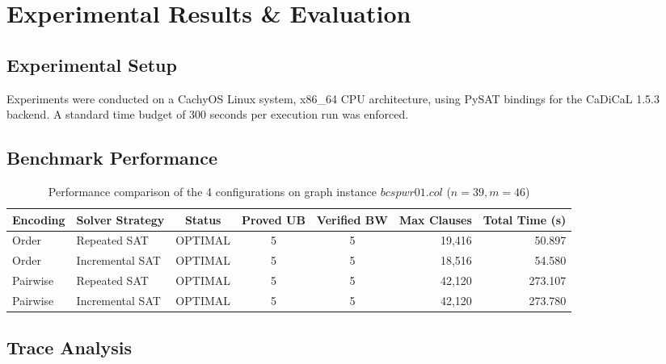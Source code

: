 
\section{Experimental Results \& Evaluation}

\subsection{Experimental Setup}
Experiments were conducted on a CachyOS Linux system, x86\_64 CPU architecture, using PySAT bindings for the CaDiCaL 1.5.3 backend. A standard time budget of 300 seconds per execution run was enforced.

\subsection{Benchmark Performance}

\begin{table}[h]
\caption{Performance comparison of the 4 configurations on graph instance $bcspwr01.col$ ($n=39, m=46$)}
\label{tab:bcspwr01}
\centering
\begin{tabular}{llcccrr}
\toprule
\textbf{Encoding} & \textbf{Solver Strategy} & \textbf{Status} & \textbf{Proved UB} & \textbf{Verified BW} & \textbf{Max Clauses} & \textbf{Total Time (s)} \\
\midrule
Order & Repeated SAT & OPTIMAL & 5 & 5 & 19,416 & 50.897 \\
Order & Incremental SAT & OPTIMAL & 5 & 5 & 18,516 & 54.580 \\
Pairwise & Repeated SAT & OPTIMAL & 5 & 5 & 42,120 & 273.107 \\
Pairwise & Incremental SAT & OPTIMAL & 5 & 5 & 42,120 & 273.780 \\
\bottomrule
\end{tabular}
\end{table}

\subsection{Trace Analysis}


